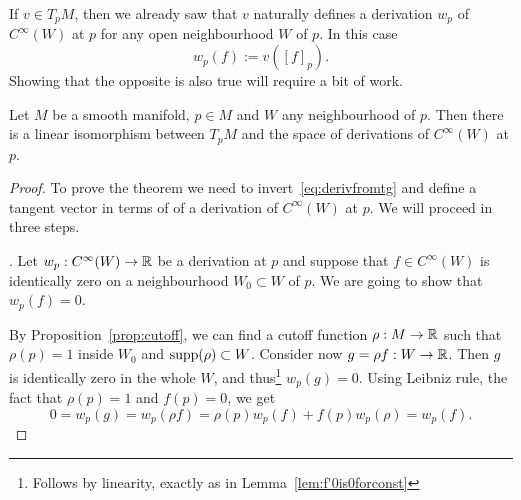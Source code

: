 If $v\in T_p M$, then we already saw that $v$ naturally defines a derivation $w_p$ of $C^\infty(W)$ at $p$ for any open neighbourhood $W$ of $p$.
In this case
\begin{equation}\label{eq:derivfromtg}
  w_p(f) := v([f]_p).
\end{equation}
Showing that the opposite is also true will require a bit of work.

\begin{proposition}
  Let $M$ be a smooth manifold, $p\in M$ and $W$ any neighbourhood of $p$.
  Then there is a linear isomorphism between $T_p M$ and the space of derivations of $C^\infty(W)$ at $p$.
\end{proposition}
\begin{proof}
  To prove the theorem we need to invert~\eqref{eq:derivfromtg} and define a tangent vector in terms of of a derivation of $C^\infty(W)$ at $p$.
  We will proceed in three steps.

  . Let $w_p:C^\infty(W) \to\mathbb{R}$ be a derivation at $p$ and suppose that $f\in C^\infty(W)$ is identically zero on a neighbourhood $W_0\subset W$ of $p$.
  We are going to show that $w_p(f)=0$.

  By Proposition~\ref{prop:cutoff}, we can find a cutoff function $\rho:M\to\mathbb{R}$ such that $\rho(p)=1$ inside $W_0$ and $\operatorname{supp}(\rho) \subset W$. Consider now $g = \rho f : W \to \mathbb{R}$.
  Then $g$ is identically zero in the whole $W$, and thus\footnote{Follows by linearity, exactly as in Lemma~\ref{lem:f'0is0forconst}} $w_p(g) = 0$.
  Using Leibniz rule, the fact that $\rho(p)=1$ and $f(p) = 0$, we get
  \begin{equation}
    0 = w_p(g) = w_p(\rho f) = \rho(p) w_p(f) + f(p)w_p(\rho) = w_p(f).
  \end{equation}


\end{proof}
